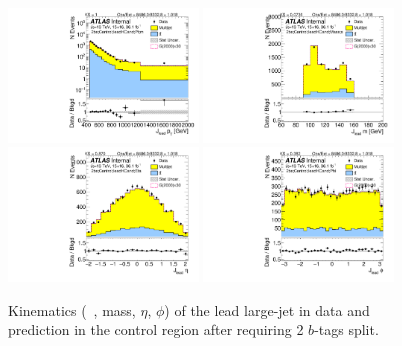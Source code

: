 \clearpage

\begin{figure}[htbp!]
\begin{center}
\includegraphics[width=0.45\textwidth,angle=-90]{figures/boosted/Control/b77_TwoTag_split_Control_leadHCand_Pt_m_1.pdf}
\includegraphics[width=0.45\textwidth,angle=-90]{figures/boosted/Control/b77_TwoTag_split_Control_leadHCand_Mass_s.pdf}\\
\includegraphics[width=0.45\textwidth,angle=-90]{figures/boosted/Control/b77_TwoTag_split_Control_leadHCand_Eta.pdf}
\includegraphics[width=0.45\textwidth,angle=-90]{figures/boosted/Control/b77_TwoTag_split_Control_leadHCand_Phi.pdf}
  \caption{Kinematics (\pt~, mass, $\eta$, $\phi$) of the lead large-\R jet in data and prediction in the control region after requiring 2 $b$-tags split. }
  \label{fig:boosted-2bs-control-ak10-lead}
\end{center}
\end{figure}

